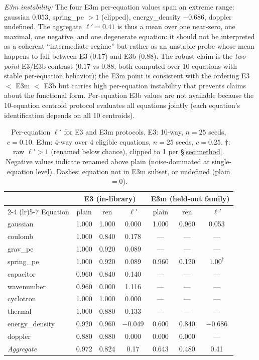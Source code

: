 \emph{E3m instability:} The four E3m per-equation values span an extreme range: gaussian $0.053$, spring\_pe $>1$ (clipped), energy\_density $-0.686$, doppler undefined.  The aggregate $\ell'{=}0.41$ is thus a mean over one near-zero, one maximal, one negative, and one degenerate equation: it should not be interpreted as a coherent ``intermediate regime'' but rather as an unstable probe whose mean happens to fall between E3 ($0.17$) and E3b ($0.88$).  The robust claim is the \emph{two-point} E3/E3b contrast ($0.17$ vs $0.88$, both computed over 10 equations with stable per-equation behavior); the E3m point is consistent with the ordering E3 $<$ E3m $<$ E3b but carries high per-equation instability that prevents claims about the functional form.  Per-equation E3b values are not available because the 10-equation centroid protocol evaluates all equations jointly (each equation's identification depends on all 10 centroids).

\begin{table}[h]
\centering
\small
\caption{Per-equation $\ell'$ for E3 and E3m protocols. E3: 10-way, $n{=}25$ seeds, $c{=}0.10$. E3m: 4-way over 4 eligible equations, $n{=}25$ seeds, $c{=}0.25$. $\dagger$: raw $\ell' > 1$ (renamed below chance), clipped to 1 per \S\ref{sec:method}. Negative values indicate renamed above plain (noise-dominated at single-equation level). Dashes: equation not in E3m subset, or undefined (plain $= 0$).}
\label{tab:per_eq_ell_prime}
\begin{tabular}{lcccccc}
\toprule
& \multicolumn{3}{c}{E3 (in-library)} & \multicolumn{3}{c}{E3m (held-out family)} \\
\cmidrule(lr){2-4} \cmidrule(lr){5-7}
Equation & plain & ren & $\ell'$ & plain & ren & $\ell'$ \\
\midrule
gaussian        & 1.000 & 1.000 & 0.000 & 1.000 & 0.960 & 0.053 \\
coulomb         & 1.000 & 0.840 & 0.178 & --- & --- & --- \\
grav\_pe        & 1.000 & 0.920 & 0.089 & --- & --- & --- \\
spring\_pe      & 1.000 & 0.920 & 0.089 & 0.960 & 0.120 & $1.00^{\dagger}$ \\
capacitor       & 0.960 & 0.840 & 0.140 & --- & --- & --- \\
wavenumber      & 0.960 & 0.000 & 1.116 & --- & --- & --- \\
cyclotron       & 1.000 & 1.000 & 0.000 & --- & --- & --- \\
thermal         & 1.000 & 0.880 & 0.133 & --- & --- & --- \\
energy\_density & 0.920 & 0.960 & $-$0.049 & 0.600 & 0.840 & $-$0.686 \\
doppler         & 0.880 & 0.880 & 0.000 & 0.000 & 0.000 & --- \\
\midrule
\textit{Aggregate} & 0.972 & 0.824 & 0.17 & 0.643 & 0.480 & 0.41 \\
\bottomrule
\end{tabular}
\end{table}

